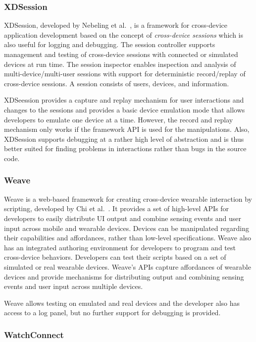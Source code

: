 \subsubsection{XDSession}

XDSession, developed by Nebeling et al.~\cite{xdsession2015}, is a framework for cross-device application development based on the concept of \emph{cross-device sessions} which is also useful for logging and debugging. The session controller supports management and testing of cross-device sessions with connected or simulated devices at run time. The session inspector enables inspection and analysis of multi-device/multi-user sessions with support for deterministic record/replay of cross-device sessions. A session consists of users, devices, and information.

XDSeession provides a capture and replay mechanism for user interactions and changes to the sessions and provides a basic device emulation mode that allows developers to emulate one device at a time. However, the record and replay mechanism only works if the framework API is used for the manipulations. Also, XDSession supports debugging at a rather high level of abstraction and is thus better suited for finding problems in interactions rather than bugs in the source code.

\subsubsection{Weave}

Weave is a web-based framework for creating cross-device wearable interaction by scripting, developed by Chi et al.~\cite{weave2015}. It provides a set of high-level APIs for developers to easily distribute UI output and combine sensing events and user input across mobile and wearable devices. Devices can be manipulated regarding their capabilities and affordances, rather than low-level specifications. Weave also has an integrated authoring environment for developers to program and test cross-device behaviors. Developers can test their scripts based on a set of simulated or real wearable devices. Weave's APIs capture affordances of wearable devices and provide mechanisms for distributing output and combining sensing events and user input across multiple devices.

Weave allows testing on emulated and real devices and the developer also has access to a log panel, but no further support for debugging is provided. 

\subsubsection{WatchConnect}

